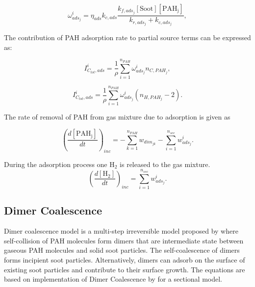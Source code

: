 \begin{equation}
	\omega^i_{ads_j} = \eta_{ads} k_{c,ads}\frac{k_{f,ads_j}[\mathrm{Soot}][\mathrm{PAH_j}]}{k_{r,ads_j}+k_{c,ads_j}}
	\label{eqn:wads_reacdim},
\end{equation}

The contribution of PAH adsorption rate to partial source terms can be expressed as:

\begin{equation}
	I^i_{C_{tot},ads} =
	\frac{1}{\rho}
	\sum_{i=1}^{n_{PAH}}
	\omega^i_{ads_j}
	n_{C,PAH_j}
	\label{eqn:ICtotads_reacdim},
\end{equation}

\begin{equation}
	I^i_{C_{tot},ads} =
	\frac{1}{\rho}
	\sum_{i=1}^{n_{PAH}}
	\omega^i_{ads_j}
	\left(n_{H,PAH_j}-2\right)
	\label{eqn:IHtotads_reacdim}.
\end{equation}

The rate of removal of PAH from gas mixture due to adsorption is given as

\begin{equation}
	\left(
	\frac{d\left[{\mathrm{PAH_j}}\right]}{dt}
	\right)_{inc}
	= 
	-\sum_{k=1}^{n_{PAH}}w_{dim_{jk}}-\sum_{i=1}^{n_{sec}}w^i_{ads_j}
	\label{eqn:PAHscrub_reacdim}.
\end{equation}

During the adsorption process one $\mathrm{H_2}$ is released to the gas mixture.
\begin{equation}
	\left(
	\frac{d\left[{\mathrm{H_2}}\right]}{dt}
	\right)_{inc}
	= 
	\sum_{i=1}^{n_{sec}}w^i_{ads_j}
	\label{eqn:H2scrub_reacdim}.
\end{equation}

\subsection{Dimer Coalescence}
Dimer coalescence model is a multi-step irreversible model proposed by \citet{blanquart2009joint} where self-collision of PAH molecules form dimers that are intermediate state between gaseous PAH molecules and solid soot particles. The self-coalescence of dimers forms incipient soot particles. Alternatively, dimers can adsorb on the surface of existing soot particles and contribute to their surface growth. The equations are based on implementation of Dimer Coalescence by \citet{sun2021modelling} for a sectional model.


